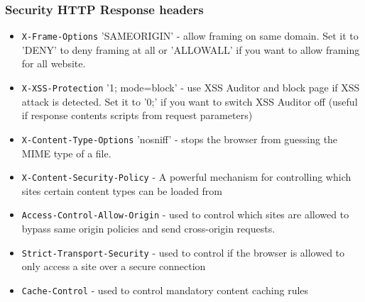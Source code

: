 \documentclass{beamer}
\begin{document}
\begin{frame}
  \frametitle{Security HTTP Response headers}
\small
  \begin{itemize}
  \item \texttt{X-Frame-Options} 'SAMEORIGIN' - allow framing on same domain. Set it to 'DENY' to deny framing at all or 'ALLOWALL' if you want to allow framing for all website.
  \item \texttt{X-XSS-Protection} '1; mode=block' - use XSS Auditor and block page if XSS attack is detected. Set it to '0;' if you want to switch XSS Auditor off (useful if response contents scripts from request parameters)
  \item \texttt{X-Content-Type-Options} 'nosniff' - stops the browser from guessing the MIME type of a file.
\item \texttt{X-Content-Security-Policy} - A powerful mechanism for controlling which sites certain content types can be loaded from
\item \texttt{Access-Control-Allow-Origin} - used to control which sites are allowed to bypass same origin policies and send cross-origin requests.
\item \texttt{Strict-Transport-Security} - used to control if the browser is allowed to only access a site over a secure connection
\item \texttt{Cache-Control} - used to control mandatory content caching rules
  \end{itemize}
\end{frame}



\end{document}
